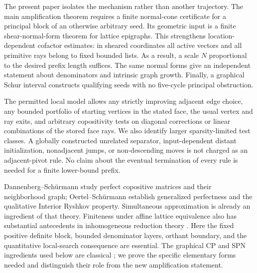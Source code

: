 \documentclass[11pt]{article}
\theoremstyle{definition}\newtheorem{definition}[theorem]{Definition}
\theoremstyle{remark}\newtheorem{remark}[theorem]{Remark}
\begin{document}
The present paper isolates the mechanism rather than another trajectory. The main amplification theorem requires a finite normal-cone certificate for a principal block of an otherwise arbitrary seed. Its geometric input is a finite shear-normal-form theorem for lattice epigraphs. This strengthens location-dependent cofactor estimates: in sheared coordinates all active vectors and all primitive rays belong to fixed bounded lists. As a result, a scale $N$ proportional to the desired prefix length suffices. The same normal forms give an independent statement about denominators and intrinsic graph growth. Finally, a graphical Schur interval constructs qualifying seeds with no five-cycle principal obstruction.

The permitted local model allows any strictly improving adjacent edge choice, any bounded portfolio of starting vertices in the stated face, the usual vertex and ray exits, and arbitrary copositivity tests on diagonal corrections or linear combinations of the stored face rays. We also identify larger sparsity-limited test classes. A globally constructed unrelated separator, input-dependent distant initialization, nonadjacent jumps, or non-descending moves is not charged as an adjacent-pivot rule. No claim about the eventual termination of every rule is needed for a finite lower-bound prefix.

Dannenberg--Sch\"urmann \cite{DS} study perfect copositive matrices and their neighborhood graph; Oertel--Sch\"urmann \cite{OS} establish generalized perfectness and the qualitative Interior Ryshkov property. Simultaneous approximation is already an ingredient of that theory. Finiteness under affine lattice equivalence also has substantial antecedents in inhomogeneous reduction theory \cite{Inhom}. Here the fixed positive definite block, bounded denominator layers, orthant boundary, and the quantitative local-search consequence are essential. The graphical CP and SPN ingredients used below are classical \cite{Drew,Barioli,SPN}; we prove the specific elementary forms needed and distinguish their role from the new amplification statement.





\end{document}
